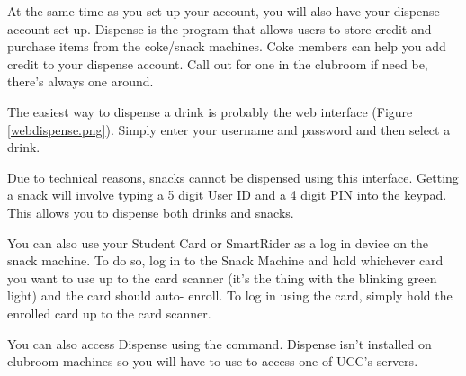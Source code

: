 

\begin{mdframed}

At the same time as you set up your account, you will also have your dispense account set up. Dispense is the program that allows users to store credit and purchase items from the coke/snack machines. Coke members can help you add credit to your dispense account. Call out for one in the clubroom if need be, there's always one around.


The easiest way to dispense a drink is probably the web interface (Figure \ref{webdispense.png}). Simply enter your username and password and then select a drink. 

Due to technical reasons, snacks cannot be dispensed using this interface. Getting a snack will involve typing a 5 digit User ID and a 4 digit PIN into the keypad. This allows you to dispense both drinks and snacks.

You can also use your Student Card or SmartRider as a log in device on the snack machine. To do so, log in to the Snack Machine and hold whichever card you want to use up to the card scanner (it's the thing with the blinking green light) and the card should auto- enroll. To log in using the card, simply hold the enrolled card up to the card scanner.


You can also access Dispense using the  command. Dispense isn't installed on clubroom machines so you will have to use  to access one of UCC's servers.

\end{mdframed}

